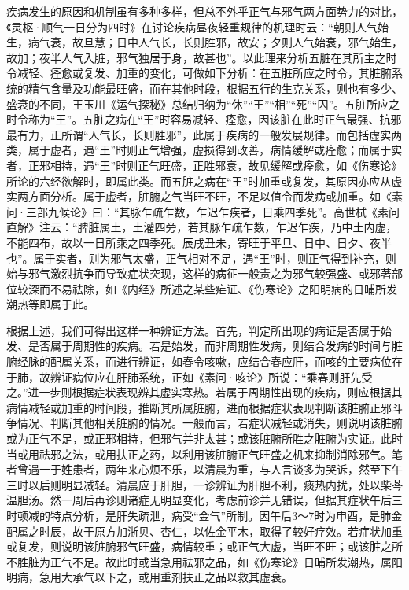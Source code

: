 \documentclass[draft,12pt]{ctexbook}
\begin{document}
疾病发生的原因和机制虽有多种多样，但总不外乎正气与邪气两方面势力的对比，《灵枢·顺气一日分为四时》在讨论疾病昼夜轻重规律的机理时云：“朝则人气始生，病气衰，故旦慧；日中人气长，长则胜邪，故安；夕则人气始衰，邪气始生，故加；夜半人气入脏，邪气独居于身，故甚也”。以此理来分析五脏在其所主之时令减轻、痊愈或复发、加重的变化，可做如下分析：在五脏所应之时令，其脏腑系统的精气含量及功能最旺盛，而在其他时段，根据五行的生克关系，则也有多少、盛衰的不同，王玉川《运气探秘》总结归纳为“休”“王”“相”“死”“囚”。五脏所应之时令称为“王”。五脏之病在“王”时容易减轻、痊愈，因该脏在此时正气最强、抗邪最有力，正所谓“人气长，长则胜邪”，此属于疾病的一般发展规律。而包括虚实两类，属于虚者，遇“王”时则正气增强，虚损得到改善，病情缓解或痊愈；而属于实者，正邪相持，遇“王”时则正气旺盛，正胜邪衰，故见缓解或痊愈，如《伤寒论》所论的六经欲解时，即属此类。而五脏之病在“王”时加重或复发，其原因亦应从虚实两方面分析。属于虚者，脏腑之气当旺不旺，不足以值令而发病或加重。如《素问·三部九候论》曰：“其脉乍疏乍数，乍迟乍疾者，日乘四季死”。高世栻《素问直解》注云：“脾脏属土，土灌四旁，若其脉乍疏乍数，乍迟乍疾，乃中土内虚，不能四布，故以一日所乘之四季死。辰戌丑未，寄旺于平旦、日中、日夕、夜半也”。属于实者，则为邪气太盛，正气相对不足，遇“王”时，则正气得到补充，则始与邪气激烈抗争而导致症状突现，这样的病征一般责之为邪气较强盛、或邪著部位较深而不易祛除，如《内经》所述之某些疟证、《伤寒论》之阳明病的日晡所发潮热等即属于此。

根据上述，我们可得出这样一种辨证方法。首先，判定所出现的病证是否属于始发、是否属于周期性的疾病。若是始发，而非周期性发病，则结合发病的时间与脏腑经脉的配属关系，而进行辨证，如春令咳嗽，应结合春应肝，而咳的主要病位在于肺，故辨证病位应在肝肺系统，正如《素问·咳论》所说：“乘春则肝先受之。”进一步则根据症状表现辨其虚实寒热。若属于周期性出现的疾病，则应根据其病情减轻或加重的时间段，推断其所属脏腑，进而根据症状表现判断该脏腑正邪斗争情况、判断其他相关脏腑的情况。一般而言，若症状减轻或消失，则说明该脏腑或为正气不足，或正邪相持，但邪气并非太甚；或该脏腑所胜之脏腑为实证。此时当或用祛邪之法，或用扶正之药，以利用该脏腑正气旺盛之机来抑制消除邪气。笔者曾遇一于姓患者，两年来心烦不乐，以清晨为重，与人言谈多为哭诉，然至下午三时以后则明显减轻。清晨应于肝胆，一诊辨证为肝胆不利，痰热内扰，处以柴芩温胆汤。然一周后再诊则诸症无明显变化，考虑前诊并无错误，但据其症状午后三时顿减的特点分析，是肝失疏泄，病受“金气”所制。因午后3〜7时为申酉，是肺金配属之时辰，故于原方加浙贝、杏仁，以佐金平木，取得了较好疗效。若症状加重或复发，则说明该脏腑邪气旺盛，病情较重；或正气大虚，当旺不旺；或该脏之所不胜脏为正气不足。故此时或当急用祛邪之品，如《伤寒论》日晡所发潮热，属阳明病，急用大承气以下之，或用重剂扶正之品以救其虚衰。
\end{document}
